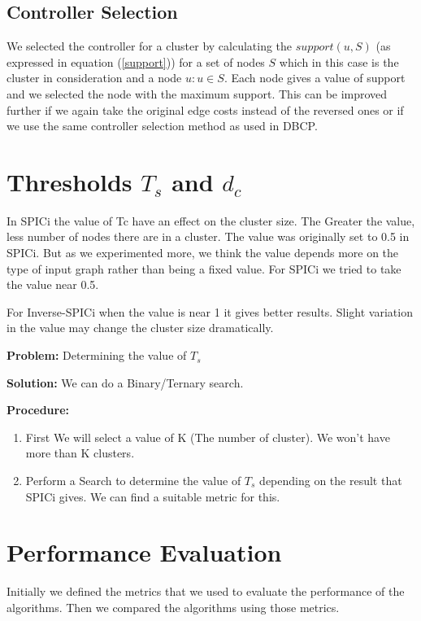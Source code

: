 \documentclass[10pt]{extarticle}
\begin{document}
	\subsection{Controller Selection}
	We selected the controller for a cluster by calculating the $support(u,S)$ (as expressed in equation (\ref{support})) for a set of nodes $S$ which in this case is the cluster in consideration and a node $u:u\in S$. Each node gives a value of support and we selected the node with the maximum support. This can be improved further if we again take the original edge costs instead of the reversed ones or if we use the same controller selection method as used in DBCP.
	
	\section{Thresholds $T_s$ and $d_c$}
	In SPICi the value of Tc have an effect on the cluster size. The Greater the value, less number of nodes there are in a cluster. The value was originally set to 0.5 in SPICi.
	But as we experimented more, we think the value depends more on the type of input graph rather than being a fixed value. For SPICi we tried to take the value near 0.5.
	
	For Inverse-SPICi when the value is near 1 it gives better results. Slight variation in the value may change the cluster size dramatically. 
	
	\textbf{Problem:} Determining the value of $T_s$
	
	
	\textbf{Solution:} We can do a Binary/Ternary search.
	
	\textbf{Procedure:} 
	\begin{enumerate}
		\item First We will select a value of K (The number of cluster). We won't have more than K clusters.
		\item Perform a Search to determine the value of $T_s$ depending on the result that SPICi gives. We can find a suitable metric for this.
	\end{enumerate}
	
	
	 
	\section{Performance Evaluation}
	
	Initially we defined the metrics that we used to evaluate the performance of the algorithms. Then we compared the algorithms using those metrics.
	
\end{document}
